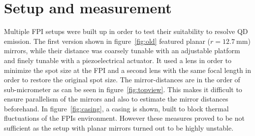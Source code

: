 \section{Setup and measurement}


Multiple \ac{FPI} setups were built up in order to test their suitability to resolve \ac{QD} emission.
The first version shown in figure~\ref{fig:old} featured planar ($r=\SI{12.7}{\milli \meter}$) mirrors, while their distance was coarsely tunable with an adjustable platform and finely tunable with a piezoelectrical actuator.
It used a lens in order to minimize the spot size at the \ac{FPI} and a second lens with the same focal length in order to restore the original spot size.
The mirror-distances are in the order of sub-micrometer as can be seen in figure~\ref{fig:topview}.
This makes it difficult to ensure parallelism of the mirrors and also to estimate the mirror distances beforehand.
In figure~\ref{fig:casing}, a casing is shown, built to block thermal fluctuations of the \acp{FPI} environment. 
However these measures proved to be not sufficient as the setup with planar mirrors turned out to be highly unstable.

